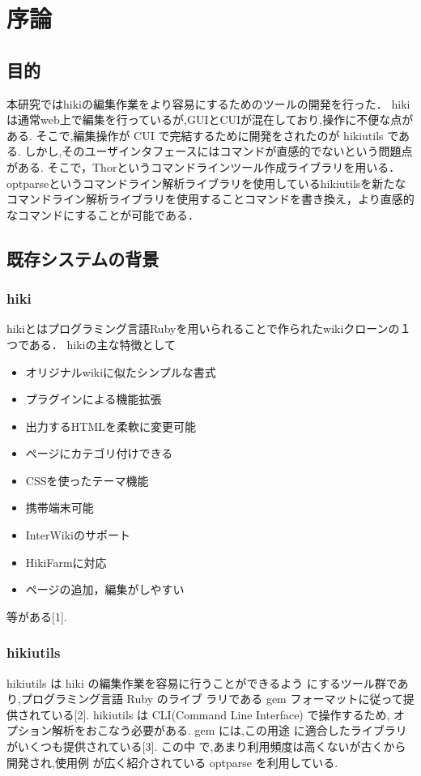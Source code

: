 \section{序論}
\subsection{目的}
本研究ではhikiの編集作業をより容易にするためのツールの開発を行った． 
hikiは通常web上で編集を行っているが,GUIとCUIが混在しており,操作に不便な点がある. 
そこで,編集操作が CUI で完結するために開発をされたのが hikiutils である. 
しかし,そのユーザインタフェースにはコマンドが直感的でないという問題点がある. 
そこで，Thorというコマンドラインツール作成ライブラリを用いる．
optparseというコマンドライン解析ライブラリを使用しているhikiutilsを新たなコマンドライン解析ライブラリを使用することコマンドを書き換え，より直感的なコマンドにすることが可能である．

\subsection{既存システムの背景}
\subsubsection{hiki}
hikiとはプログラミング言語Rubyを用いられることで作られたwikiクローンの１つである．
hikiの主な特徴として

\begin{itemize}
\item オリジナルwikiに似たシンプルな書式
\item プラグインによる機能拡張
\item 出力するHTMLを柔軟に変更可能
\item ページにカテゴリ付けできる
\item CSSを使ったテーマ機能
\item 携帯端末可能
\item InterWikiのサポート
\item HikiFarmに対応
\item ページの追加，編集がしやすい
\end{itemize}
等がある[1].

\subsubsection{hikiutils}
hikiutils は hiki の編集作業を容易に行うことができるよう にするツール群であり,プログラミング言語 Ruby のライブ ラリである gem フォーマットに従って提供されている[2]. 
hikiutils は CLI(Command Line Interface) で操作するため, オプション解析をおこなう必要がある. 
gem には,この用途 に適合したライブラリがいくつも提供されている[3]. 
この中 で,あまり利用頻度は高くないが古くから開発され,使用例 が広く紹介されている optparse を利用している.


